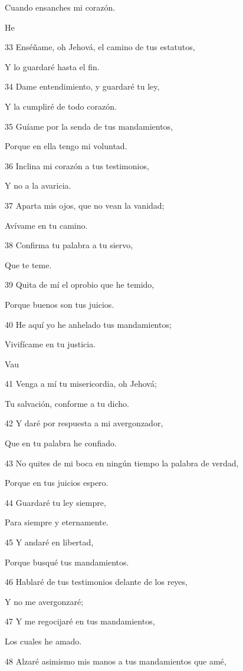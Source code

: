 \par Cuando ensanches mi corazón.
\par He
\par 33 Enséñame, oh Jehová, el camino de tus estatutos,
\par Y lo guardaré hasta el fin.
\par 34 Dame entendimiento, y guardaré tu ley,
\par Y la cumpliré de todo corazón.
\par 35 Guíame por la senda de tus mandamientos,
\par Porque en ella tengo mi voluntad.
\par 36 Inclina mi corazón a tus testimonios,
\par Y no a la avaricia.
\par 37 Aparta mis ojos, que no vean la vanidad;
\par Avívame en tu camino.
\par 38 Confirma tu palabra a tu siervo,
\par Que te teme.
\par 39 Quita de mí el oprobio que he temido,
\par Porque buenos son tus juicios.
\par 40 He aquí yo he anhelado tus mandamientos;
\par Vivifícame en tu justicia.
\par Vau
\par 41 Venga a mí tu misericordia, oh Jehová;
\par Tu salvación, conforme a tu dicho.
\par 42 Y daré por respuesta a mi avergonzador,
\par Que en tu palabra he confiado.
\par 43 No quites de mi boca en ningún tiempo la palabra de verdad,
\par Porque en tus juicios espero.
\par 44 Guardaré tu ley siempre,
\par Para siempre y eternamente.
\par 45 Y andaré en libertad,
\par Porque busqué tus mandamientos.
\par 46 Hablaré de tus testimonios delante de los reyes,
\par Y no me avergonzaré;
\par 47 Y me regocijaré en tus mandamientos,
\par Los cuales he amado.
\par 48 Alzaré asimismo mis manos a tus mandamientos que amé,

